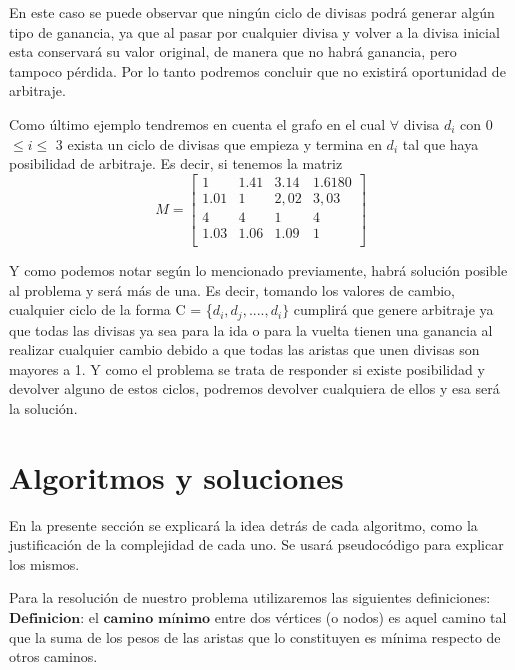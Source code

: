 \documentclass[11pt,a4paper]{article}
\begin{document}
En este caso se puede observar que ning\'un ciclo de divisas podr\'a generar alg\'un tipo de ganancia, ya que al pasar por cualquier divisa y volver a la divisa inicial esta conservar\'a su valor original, de manera que no habr\'a ganancia, pero tampoco p\'erdida. Por lo tanto podremos concluir que  no existir\'a oportunidad de arbitraje.
\\


Como \'ultimo ejemplo tendremos en cuenta el grafo en el cual $\forall$ divisa $d_{i}$ con 0 $\leq i \leq$ 3 exista un ciclo de divisas que empieza y termina en $d_{i}$ tal que haya posibilidad de arbitraje. Es decir, si tenemos la matriz
\[
M=
  \begin{bmatrix}
    1 & 1.41 & 3.14 & 1.6180 \\
    1.01 & 1 & 2,02 & 3,03 \\
    4 & 4 & 1 & 4 \\
    1.03 & 1.06 & 1.09 & 1 \\
  \end{bmatrix}
\]


Y como podemos notar seg\'un lo mencionado previamente, habr\'a  soluci\'on posible al problema y ser\'a m\'as de una. Es decir, tomando los valores de cambio, cualquier ciclo de la forma C = \{$d_{i}, d_{j},....,d_{i} \}$ cumplir\'a que genere arbitraje ya que todas las divisas ya sea para la ida o para la vuelta tienen una ganancia al realizar cualquier cambio debido a que todas las aristas que unen divisas son mayores a 1. Y como el problema se trata de responder si existe posibilidad y devolver alguno de estos ciclos, podremos devolver cualquiera de ellos y esa ser\'a la soluci\'on.
\pagebreak
\section{\huge Algoritmos y soluciones}

En la presente secci\'on se explicar\'a la idea detr\'as de cada algoritmo, como la justificaci\'on de la complejidad de cada uno. Se usar\'a pseudoc\'odigo para explicar los mismos.


Para la resoluci\'on de nuestro problema utilizaremos las siguientes definiciones:
\\

{\large $\textbf{Definicion:}$} el $\textbf{camino m\'inimo}$ entre dos vértices (o nodos) es aquel camino tal que la suma de los pesos de las aristas que lo constituyen es mínima respecto de otros caminos.
\\
\end{document}
